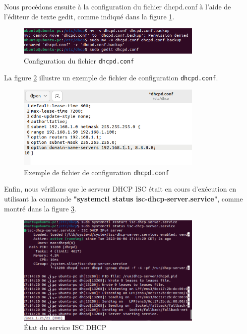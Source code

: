 Nous procédons ensuite à la configuration du fichier dhcpd.conf à l'aide de l'éditeur de texte gedit, comme indiqué dans la figure \ref{fig:dhcpd-conf-configuration}.

\begin{figure}[H]
    \centering
    \includegraphics[width=0.8\textwidth]{Images/dhcp3.png}
    \caption{Configuration du fichier \texttt{dhcpd.conf}}
    \label{fig:dhcpd-conf-configuration}
\end{figure}

La figure  \ref{fig:dhcpd-conf-example} illustre un exemple de fichier de configuration \texttt{dhcpd.conf}.

\begin{figure}[H]
    \centering
    \includegraphics[width=0.8\textwidth]{Images/dhcp4.png}
    \caption{Exemple de fichier de configuration \texttt{dhcpd.conf}}
    \label{fig:dhcpd-conf-example}
\end{figure}

Enfin, nous vérifions que le serveur DHCP ISC était en cours d'exécution en utilisant la commande \textbf{"systemctl status isc-dhcp-server.service"}, comme montré dans la figure \ref{fig:isc-dhcp-service-status}.

\begin{figure}[H]
    \centering
    \includegraphics[width=0.8\textwidth]{Images/dhcp5.png}
    \caption{État du service ISC DHCP}
    \label{fig:isc-dhcp-service-status}
\end{figure}

